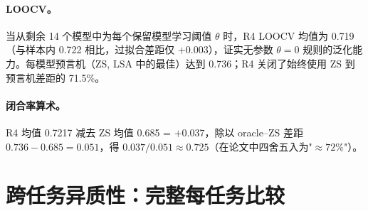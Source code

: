 \documentclass[11pt,a4paper,fontset=fandol]{ctexart}
\begin{document}
\paragraph{LOOCV。} 当从剩余 14 个模型中为每个保留模型学习阈值 $\theta$ 时，R4 LOOCV 均值为 0.719（与样本内 0.722 相比，过拟合差距仅 $+$0.003），证实无参数 $\theta=0$ 规则的泛化能力。每模型预言机（{ZS, LSA} 中的最佳）达到 0.736；R4 关闭了始终使用 ZS 到预言机差距的 71.5\%。

\paragraph{闭合率算术。} R4 均值 0.7217 减去 ZS 均值 0.685 = $+0.037$，除以 oracle--ZS 差距 $0.736-0.685 = 0.051$，得 $0.037/0.051 \approx 0.725$（在论文中四舍五入为"$\approx 72\%$"）。

\section{跨任务异质性：完整每任务比较}
\label{app:fourtask}
\end{document}

